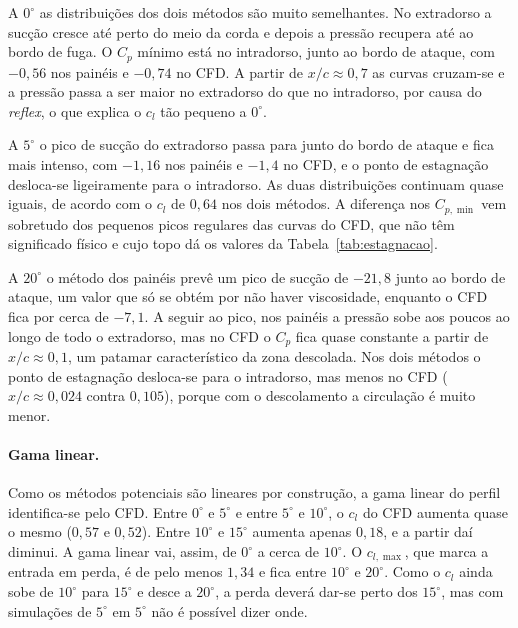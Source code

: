 A $0^\circ$ as distribuições dos dois métodos são muito semelhantes. No
extradorso a sucção cresce até perto do meio da corda e depois a pressão
recupera até ao bordo de fuga. O $C_p$ mínimo está no intradorso, junto ao
bordo de ataque, com $-0{,}56$ nos painéis e $-0{,}74$ no CFD. A partir de
$x/c \approx 0{,}7$ as curvas cruzam-se e a pressão passa a ser maior no
extradorso do que no intradorso, por causa do \emph{reflex}, o que explica o
$c_l$ tão pequeno a $0^\circ$.

A $5^\circ$ o pico de sucção do extradorso passa para junto do bordo de ataque
e fica mais intenso, com $-1{,}16$ nos painéis e $-1{,}4$ no CFD, e o ponto de
estagnação desloca-se ligeiramente para o intradorso. As duas distribuições
continuam quase iguais, de acordo com o $c_l$ de $0{,}64$ nos dois métodos. A
diferença nos $C_{p,\min}$ vem sobretudo dos pequenos picos regulares das curvas
do CFD, que não têm significado físico e cujo topo dá os valores da
Tabela~\ref{tab:estagnacao}. 

A $20^\circ$ o método dos painéis prevê um pico de sucção de $-21{,}8$ junto ao
bordo de ataque, um valor que só se obtém por não haver viscosidade, enquanto o
CFD fica por cerca de $-7{,}1$. A seguir ao pico, nos painéis a pressão sobe aos
poucos ao longo de todo o extradorso, mas no CFD o $C_p$ fica quase constante a
partir de $x/c \approx 0{,}1$, um patamar característico da zona descolada. Nos dois métodos o ponto de estagnação desloca-se para
o intradorso, mas menos no CFD ($x/c \approx 0{,}024$ contra $0{,}105$), porque
com o descolamento a circulação é muito menor.

\paragraph{Gama linear.}
Como os métodos potenciais são lineares por construção, a gama linear do perfil
identifica-se pelo CFD. Entre $0^\circ$ e $5^\circ$ e entre $5^\circ$ e
$10^\circ$, o $c_l$ do CFD aumenta quase o mesmo ($0{,}57$ e $0{,}52$). Entre
$10^\circ$ e $15^\circ$ aumenta apenas $0{,}18$, e a partir daí diminui. A gama
linear vai, assim, de $0^\circ$ a cerca de $10^\circ$. O $c_{l,\max}$, que marca a
entrada em perda, é de pelo menos $1{,}34$ e fica entre $10^\circ$ e
$20^\circ$. Como o $c_l$ ainda sobe de $10^\circ$ para $15^\circ$ e desce a
$20^\circ$, a perda deverá dar-se perto dos $15^\circ$, mas com
simulações de $5^\circ$ em $5^\circ$ não é possível dizer onde.
